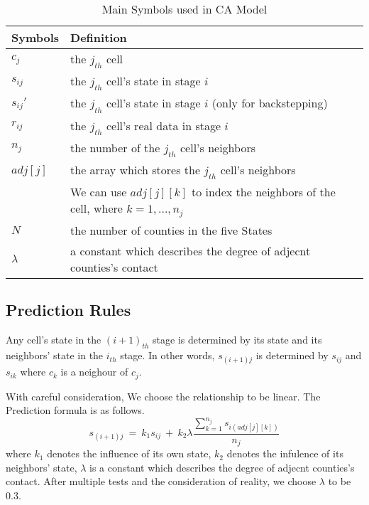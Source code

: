 \documentclass{mcmthesis}
\begin{document}
\begin{table}[!h]
\centering
\caption{Main Symbols used in CA Model} %
\begin{tabular}{ll}
\toprule[2.5pt]
\textbf{Symbols}& \textbf{Definition} \\
\midrule[1.5pt]
$c_j$ & the $j_{th}$ cell \\
\midrule
$s_{ij}$& the $j_{th}$ cell's state in stage $i$ \\
\midrule
$s_{ij}'$& the $j_{th}$ cell's state in stage $i$ (only for backstepping)\\
\midrule
$r_{ij}$ & the $j_{th}$ cell's real data in stage $i$ \\
\midrule
$n_{j}$ & the number of the $j_{th}$ cell's neighbors\\
\midrule
$adj[j]$ & the array which stores the $j_{th}$ cell's neighbors \\
 & We can use $adj[j][k]$ to index the neighbors of the cell, where $k = 1,...,n_{j}$\\
\midrule
$N$ & the number of counties in the five States\\
\midrule
$\lambda$ & a constant which describes the degree of adjecnt counties's contact \\
\bottomrule
\end{tabular}
\end{table}


\newpage
\subsection{Prediction Rules }
Any cell's state in the $(i+1)_{th}$ stage is determined by its state and its neighbors' state in the $i_{th}$ stage. In other words, $s_{(i+1)j}$ is determined by $s_{ij}$ and $s_{ik}$ where $c_k$ is a neighour of $c_j$.\par
With careful consideration, We choose the relationship to be linear. The Prediction formula is as follows.
      \begin{equation} s_{(i+1)j} \ = \ k_1 s_{ij} \ + \ k_2 \lambda \frac{\sum\limits_{k=1} ^{n_j} s_{i (adj[j][k])} }{n_j} \end{equation}
    where $k_1$ denotes the influence of its own state, $k_2$ denotes the infulence of its neighbors' state, $\lambda$ is a constant which describes the degree of adjecnt counties's contact. After multiple tests and the consideration of reality, we choose $\lambda$ to be 0.3.\par
\end{document}
